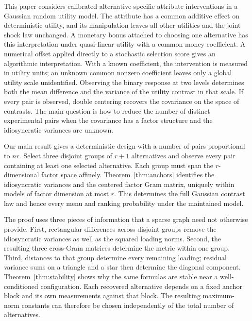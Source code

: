 \documentclass[11pt]{amsart}
\theoremstyle{definition}\newtheorem{example}[theorem]{Example}
\theoremstyle{remark}\newtheorem{remark}[theorem]{Remark}
\begin{document}
This paper considers calibrated alternative-specific attribute interventions in a Gaussian random utility model. The attribute has a common additive effect on deterministic utility, and its manipulation leaves all other utilities and the joint shock law unchanged. A monetary bonus attached to choosing one alternative has this interpretation under quasi-linear utility with a common money coefficient. A numerical offset applied directly to a stochastic selection score gives an algorithmic interpretation. With a known coefficient, the intervention is measured in utility units; an unknown common nonzero coefficient leaves only a global utility scale unidentified. Observing the binary response at two levels determines both the mean difference and the variance of the utility contrast in that scale. If every pair is observed, double centering recovers the covariance on the space of contrasts. The main question is how to reduce the number of distinct experimental pairs when the covariance has a factor structure and the idiosyncratic variances are unknown.

Our main result gives a deterministic design with a number of pairs proportional to $nr$. Select three disjoint groups of $r+1$ alternatives and observe every pair containing at least one selected alternative. Each group must span the $r$-dimensional factor space affinely. Theorem~\ref{thm:anchors} identifies the idiosyncratic variances and the centered factor Gram matrix, uniquely within models of factor dimension at most $r$. This determines the full Gaussian contrast law and hence every menu and ranking probability under the maintained model.

The proof uses three pieces of information that a sparse graph need not otherwise provide. First, rectangular differences across disjoint groups remove the idiosyncratic variances as well as the squared loading norms. Second, the resulting three cross-Gram matrices determine the metric within one group. Third, distances to that group determine every remaining loading; residual variance sums on a triangle and a star then determine the diagonal component. Theorem~\ref{thm:stability} shows why the same formulas are stable near a well-conditioned configuration. Each recovered alternative depends on a fixed anchor block and its own measurements against that block. The resulting maximum-norm constants can therefore be chosen independently of the total number of alternatives.
\end{document}
